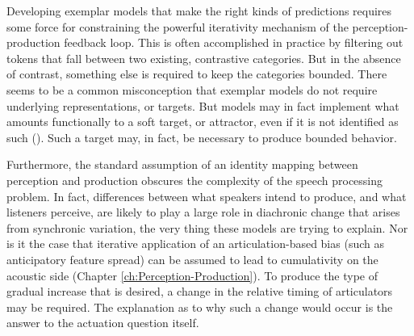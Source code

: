 Developing exemplar models that make the right kinds of predictions
requires some force for constraining the powerful iterativity mechanism
of the perception-production feedback loop. This is often accomplished
in practice by filtering out tokens that fall between two existing,
contrastive categories. But in the absence of contrast, something
else is required to keep the categories bounded. There seems to be
a common misconception that exemplar models do not require underlying
representations, or targets. But models may in fact implement what
amounts functionally to a soft target, or attractor, even if it is
not identified as such (). Such
a target may, in fact, be necessary to produce bounded behavior.

Furthermore, the standard assumption of an identity mapping between
perception and production obscures the complexity of the speech processing
problem. In fact, differences between what speakers intend to produce,
and what listeners perceive, are likely to play a large role in diachronic
change that arises from synchronic variation, the very thing these
models are trying to explain. Nor is it the case that iterative application
of an articulation-based bias (such as anticipatory feature spread)
can be assumed to lead to cumulativity on the acoustic side (Chapter
\ref{ch:Perception-Production}). To produce the type of gradual
increase that is desired, a change in the relative timing of articulators
may be required. The explanation as to why such a change would occur
is the answer to the actuation question itself.


